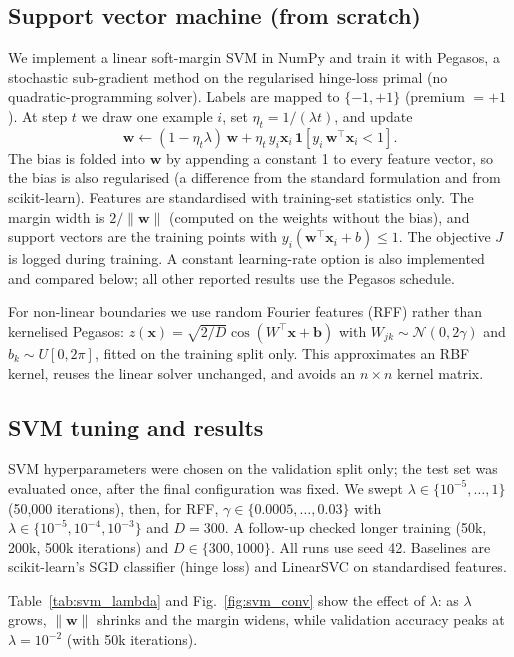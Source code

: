 \documentclass[10pt,twocolumn,a4paper]{article}
\begin{document}
\subsection{Support vector machine (from scratch)}
We implement a linear soft-margin SVM in NumPy and train it with Pegasos,
a stochastic sub-gradient method on the regularised hinge-loss primal
(no quadratic-programming solver). Labels are mapped to $\{-1,+1\}$
(premium $=+1$). At step $t$ we draw one example $i$, set
$\eta_t = 1/(\lambda t)$, and update
\begin{equation}
  \mathbf{w} \leftarrow (1-\eta_t\lambda)\,\mathbf{w}
  + \eta_t\, y_i \mathbf{x}_i \,\mathbf{1}\!\left[y_i\,\mathbf{w}^{\top}\mathbf{x}_i < 1\right].
\end{equation}
The bias is folded into $\mathbf{w}$ by appending a constant 1 to every
feature vector, so the bias is also regularised (a difference from the
standard formulation and from scikit-learn). Features are standardised
with training-set statistics only. The margin width is $2/\lVert\mathbf{w}\rVert$
(computed on the weights without the bias), and support vectors are the
training points with $y_i(\mathbf{w}^{\top}\mathbf{x}_i+b)\le 1$. The
objective $J$ is logged during training. A constant learning-rate option
is also implemented and compared below; all other reported results use the Pegasos schedule.

For non-linear boundaries we use random Fourier features (RFF) rather than
kernelised Pegasos: $z(\mathbf{x})=\sqrt{2/D}\cos(W^{\top}\mathbf{x}+\mathbf{b})$
with $W_{jk}\sim\mathcal{N}(0,2\gamma)$ and $b_k\sim U[0,2\pi]$, fitted on
the training split only. This approximates an RBF kernel, reuses the linear
solver unchanged, and avoids an $n\times n$ kernel matrix.

\subsection{SVM tuning and results}
SVM hyperparameters were chosen on the validation split only; the test set
was evaluated once, after the final configuration was fixed. We swept
$\lambda\in\{10^{-5},\dots,1\}$ (50{,}000 iterations), then, for RFF,
$\gamma\in\{0.0005,\dots,0.03\}$ with $\lambda\in\{10^{-5},10^{-4},10^{-3}\}$
and $D=300$. A follow-up checked longer training (50k, 200k, 500k iterations)
and $D\in\{300,1000\}$. All runs use seed 42. Baselines are scikit-learn's
SGD classifier (hinge loss) and LinearSVC on standardised features.

Table~\ref{tab:svm_lambda} and Fig.~\ref{fig:svm_conv} show the effect of $\lambda$: as $\lambda$ grows,
$\lVert\mathbf{w}\rVert$ shrinks and the margin widens, while validation
accuracy peaks at $\lambda=10^{-2}$ (with 50k iterations).
\end{document}

